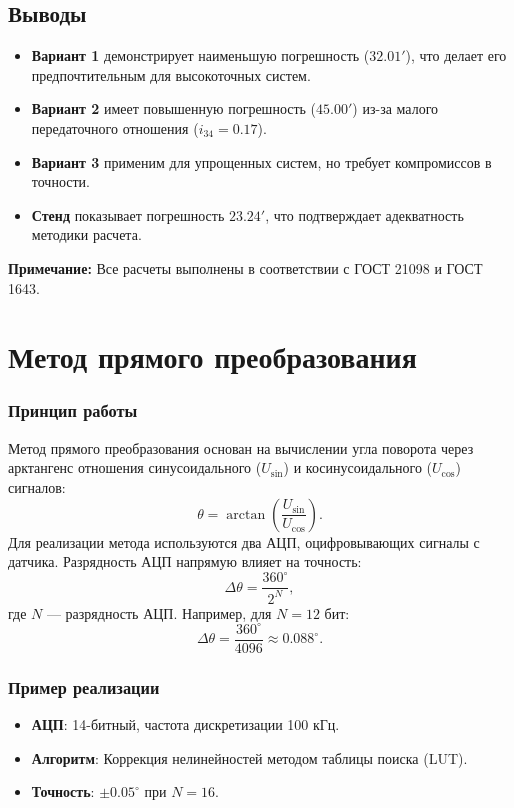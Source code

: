 \subsection{Выводы}
\begin{itemize}
    \item \textbf{Вариант 1} демонстрирует наименьшую погрешность (\(32.01'\)), что делает его предпочтительным для высокоточных систем.
    \item \textbf{Вариант 2} имеет повышенную погрешность (\(45.00'\)) из-за малого передаточного отношения (\(i_{34} = 0.17\)).
    \item \textbf{Вариант 3} применим для упрощенных систем, но требует компромиссов в точности.
    \item \textbf{Стенд} показывает погрешность \(23.24'\), что подтверждает адекватность методики расчета.
\end{itemize}
 
\textbf{Примечание:} Все расчеты выполнены в соответствии с ГОСТ 21098 и ГОСТ 1643. %


\section{Метод прямого преобразования}
\subsubsection*{Принцип работы}
Метод прямого преобразования основан на вычислении угла поворота через арктангенс отношения синусоидального (\(U_{\sin}\)) и косинусоидального (\(U_{\cos}\)) сигналов:
\[
\theta = \arctan\left(\frac{U_{\sin}}{U_{\cos}}\right).
\]
Для реализации метода используются два АЦП, оцифровывающих сигналы с датчика. Разрядность АЦП напрямую влияет на точность: 
\[
\Delta\theta = \frac{360^\circ}{2^N},
\]
где \(N\) — разрядность АЦП. Например, для \(N = 12\) бит:
\[
\Delta\theta = \frac{360^\circ}{4096} \approx 0.088^\circ.
\]

\subsubsection*{Пример реализации}
\begin{itemize}
    \item \textbf{АЦП}: 14-битный, частота дискретизации 100 кГц.
    \item \textbf{Алгоритм}: Коррекция нелинейностей методом таблицы поиска (LUT).
    \item \textbf{Точность}: \(\pm0.05^\circ\) при \(N=16\).
\end{itemize}
